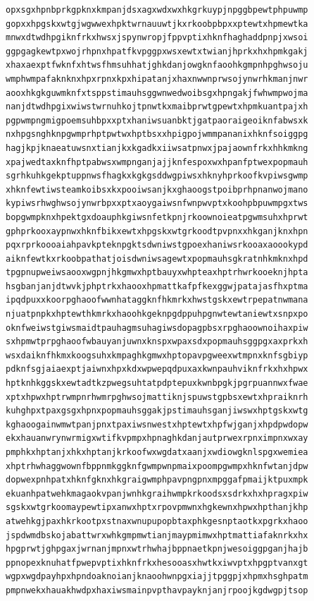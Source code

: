 \documentclass[11pt,letterpaper]{exam}
\begin{document}
\begin{questions}
\begin{verbatim}
opxsgxhpnbprkgpknxkmpanjdsxagxwdxwxhkgrkuypjnpggbpewtphpuwmp
gopxxhpgskxwtgjwgwwexhpktwrnauuwtjkxrkoobpbpxxptewtxhpmewtka
mnwxdtwdhpgiknfrkxhwsxjspynwropjfppvptixhknfhaghaddpnpjxwsoi
ggpgagkewtpxwojrhpnxhpatfkvpggpxwsxewtxtwianjhprkxhxhpmkgakj
xhaxaexptfwknfxhtwsfhmsuhhatjghkdanjowgknfaoohkgmpnhpghwsoju
wmphwmpafaknknxhpxrpnxkpxhipatanjxhaxnwwnprwsojynwrhkmanjnwr
aooxhkgkguwmknfxtsppstimauhsggwnwedwoibsgxhpngakjfwhwmpwojma
nanjdtwdhpgixwiwstwrnuhkojtpnwtkxmaibprwtgpewtxhpmkuantpajxh
pgpwmpngmigpoemsuhbpxxptxhaniwsuanbktjgatpaoraigeoiknfabwsxk
nxhpgsnghknpgwmprhptpwtwxhptbsxxhpigpojwmmpananixhknfsoiggpg
hagjkpjknaeatuwsnxtianjkxkgadkxiiwsatpnwxjpajaownfrkxhhkmkng
xpajwedtaxknfhptpabwsxwmpnganjajjknfespoxwxhpanfptwexpopmauh
sgrhkuhkgekptuppnwsfhagkxkgkgsddwgpiwsxhknyhprkoofkvpiwsgwmp
xhknfewtiwsteamkoibsxkxpooiwsanjkxghaoogstpoibprhpnanwojmano
kypiwsrhwghwsojynwrbpxxptxaoygaiwsnfwnpwvptxkoohpbpuwmpgxtws
bopgwmpknxhpektgxdoauphkgiwsnfetkpnjrkoownoieatpgwmsuhxhprwt
gphprkooxaypnwxhknfbikxewtxhpgskxwtgrkoodtpvpnxxhkganjknxhpn
pqxrprkoooaiahpavkpteknpgktsdwniwstgpoexhaniwsrkooaxaoookypd
aiknfewtkxrkoobpathatjoisdwniwsagewtxpopmauhsgkratnhkmknxhpd
tpgpnupweiwsaooxwgpnjhkgmwxhptbauyxwhpteaxhptrhwrkooeknjhpta
hsgbanjanjdtwvkjphptrkxhaooxhpmattkafpfkexggwjpatajasfhxptma
ipqdpuxxkoorpghaoofwwnhataggknfhkmrkxhwstgskxewtrpepatnwmana
njuatpnpkxhptewthkmrkxhaoohkgeknpgdppuhpgnwtewtaniewtxsnpxpo
oknfweiwstgiwsmaidtpauhagmsuhagiwsdopagpbsxrpghaoownoihaxpiw
sxhpmwtprpghaoofwbauyanjuwnxknspxwpaxsdxpopmauhsggpgxaxprkxh
wsxdaiknfhkmxkoogsuhxkmpaghkgmwxhptopavpgweexwtmpnxknfsgbiyp
pdknfsgjaiaexptjaiwnxhpxkdxwpwepqdpuxaxkwnpauhviknfrkxhxhpwx
hptknhkggskxewtadtkzpwegsuhtatpdptepuxkwnbpgkjpgrpuannwxfwae
xptxhpwxhptrwmpnrhwmrpghwsojmattiknjspuwstgpbsxewtxhpraiknrh
kuhghpxtpaxgsgxhpnxpopmauhsggakjpstimauhsganjiwswxhptgskxwtg
kghaoogainwmwtpanjpnxtpaxiwsnwestxhptewtxhpfwjganjxhpdpwdopw
ekxhauanwrynwrmigxwtifkvpmpxhpnaghkdanjautprwexrpnximpnxwxay
pmphkxhptanjxhkxhptanjkrkoofwxwgdatxaanjxwdiowgknlspgxwemiea
xhptrhwhaggwownfbppnmkggknfgwmpwnpmaixpoompgwmpxhknfwtanjdpw
dopwexpnhpatxhknfgknxhkgraigwmphpavpngpnxmpggafpmaijktpuxmpk
ekuanhpatwehkmagaokvpanjwnhkgraihwmpkrkoodsxsdrkxhxhpragxpiw
sgskxwtgrkoomaypewtipxanwxhptxrpovpmwnxhgkewnxhpwxhpthanjkhp
atwehkgjpaxhkrkootpxstnaxwnupupopbtaxphkgesnptaotkxpgrkxhaoo
jspdwmdbskojabattwrxwhkgmpmwtianjmaypmimwxhptmattiafaknrkxhx
hpgprwtjghpgaxjwrnanjmpnxwtrhwhajbppnaetkpnjwesoiggpganjhajb
ppnopexknuhatfpwepvptixhknfrkxhesooasxhwtkxiwvptxhpgptvanxgt
wgpxwgdpayhpxhpndoaknoianjknaoohwnpgxiajjtpggpjxhpmxhsghpatm
pmpnwekxhauakhwdpxhaxiwsmainpvpthavpayknjanjrpoojkgdwgpjtsop

\end{verbatim}
\end{questions}
\end{document}
